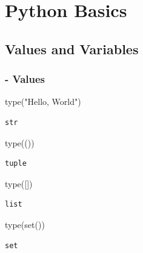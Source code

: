 \documentclass[
  letterpaper,
  DIV=11,
  numbers=noendperiod]{scrreprt}
\newenvironment{Shaded}{\begin{snugshade}}{\end{snugshade}}
\newcommand{\BuiltInTok}[1]{\textcolor[rgb]{0.00,0.23,0.31}{#1}}
\newcommand{\NormalTok}[1]{\textcolor[rgb]{0.00,0.23,0.31}{#1}}
\newcommand{\StringTok}[1]{\textcolor[rgb]{0.13,0.47,0.30}{#1}}
\begin{document}
\chapter{Python Basics}\label{python-basics}

\section{Values and Variables}\label{values-and-variables}

\subsection{- Values}\label{values}

\begin{Shaded}
\begin{Highlighting}[]
\BuiltInTok{type}\NormalTok{(}\StringTok{"Hello, World"}\NormalTok{)}
\end{Highlighting}
\end{Shaded}

\begin{verbatim}
str
\end{verbatim}

\begin{Shaded}
\begin{Highlighting}[]
\BuiltInTok{type}\NormalTok{(())}
\end{Highlighting}
\end{Shaded}

\begin{verbatim}
tuple
\end{verbatim}

\begin{Shaded}
\begin{Highlighting}[]
\BuiltInTok{type}\NormalTok{([])}
\end{Highlighting}
\end{Shaded}

\begin{verbatim}
list
\end{verbatim}

\begin{Shaded}
\begin{Highlighting}[]
\BuiltInTok{type}\NormalTok{(}\BuiltInTok{set}\NormalTok{())}
\end{Highlighting}
\end{Shaded}

\begin{verbatim}
set
\end{verbatim}
\end{document}
